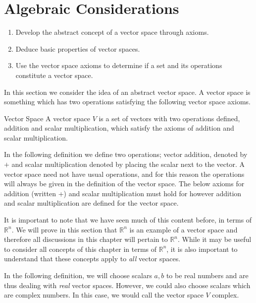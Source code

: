 \section{Algebraic Considerations}

\begin{outcome}
\begin{enumerate}
\item[A.] Develop the abstract concept of a vector space through axioms.

\item[B.] Deduce basic properties of vector spaces.

\item[C.]  Use the vector space axioms to determine if a set and its operations constitute a vector space.
\end{enumerate}
\end{outcome}

In this section we consider the idea of an abstract vector space. A vector space is
something which has two operations satisfying the following vector space
axioms.

\begin{definition}{Vector Space}\label{def:vectorspace}
A vector space $V$  is a set of vectors with two operations defined, addition and scalar multiplication, which satisfy the axioms of addition and scalar multiplication. 
\end{definition}

 In the following definition we define two operations; vector addition, denoted by $+$ and scalar
multiplication denoted by placing the scalar next to the vector. A vector space need not have usual operations, and for this reason the operations will always be given in the definition of the vector space. The below axioms for addition (written +) and scalar multiplication must hold for however addition and scalar multiplication are defined for the vector space.  

It is important to note that we have seen much of this content before, in terms of $\mathbb{R}^n$. We will prove in this section that $\mathbb{R}^n$ is an example of a vector space and therefore all discussions in this chapter will pertain to $\mathbb{R}^n$. While it may be useful to consider all concepts of this chapter in terms of $\mathbb{R}^n$, it is also important to understand that these concepts apply to \textit{all} vector spaces. 

In the following definition, we will choose scalars $a,b$ to be real numbers and are thus dealing with \textit{real} vector spaces. However, we could also choose scalars which are complex numbers. In this case, we would call the vector space $V$ complex. 

